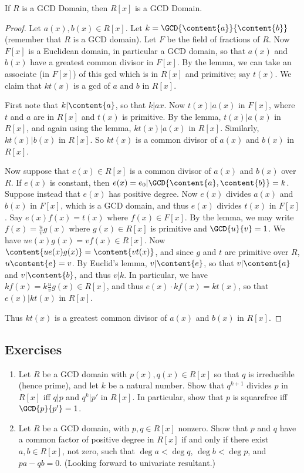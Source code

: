 \documentclass{article}
\begin{document}
\begin{prop}
If $R$ is a GCD Domain, then $R[x]$ is a GCD Domain.
\end{prop}

\begin{proof}
Let $a(x), b(x) \in R[x]$. Let $k = \GCD{\content{a}}{\content{b}}$ (remember that $R$ is a GCD domain). Let $F$ be the field of fractions of $R$. Now $F[x]$ is a Euclidean domain, in particular a GCD domain, so that $a(x)$ and $b(x)$ have a greatest common divisor in $F[x]$. By the lemma, we can take an associate (in $F[x]$) of this gcd which is in $R[x]$ and primitive; say $t(x)$. We claim that $kt(x)$ is a gcd of $a$ and $b$ in $R[x]$.

First note that $k|\content{a}$, so that $k|a{x}$. Now $t(x)|a(x)$ in $F[x]$, where $t$ and $a$ are in $R[x]$ and $t(x)$ is primitive. By the lemma, $t(x)|a(x)$ in $R[x]$, and again using the lemma, $kt(x)|a(x)$ in $R[x]$. Similarly, $kt(x)|b(x)$ in $R[x]$. So $kt(x)$ is a common divisor of $a(x)$ and $b(x)$ in $R[x]$.

Now suppose that $e(x) \in R[x]$ is a common divisor of $a(x)$ and $b(x)$ over $R$. If $e(x)$ is constant, then $e(x) = e_0 | \GCD{\content{a}, \content{b}} = k$. Suppose instead that $e(x)$ has positive degree. Now $e(x)$ divides $a(x)$ and $b(x)$ in $F[x]$, which is a GCD domain, and thus $e(x)$ divides $t(x)$ in $F[x]$. Say $e(x)f(x) = t(x)$ where $f(x) \in F[x]$. By the lemma, we may write $f(x) = \frac{u}{v}g(x)$ where $g(x) \in R[x]$ is primitive and $\GCD{u}{v} = 1$. We have $ue(x)g(x) = vf(x) \in R[x]$. Now $\content{ue(x)g(x)} = \content{vt(x)}$, and since $g$ and $t$ are primitive over $R$, $u\content{e} = v$. By Euclid's lemma, $v|\content{e}$, so that $v|\content{a}$ and $v|\content{b}$, and thus $v|k$. In particular, we have $kf(x) = k\frac{u}{v}g(x) \in R[x]$, and thus $e(x) \cdot kf(x) = kt(x)$, so that $e(x)|kt(x)$ in $R[x]$.

Thus $kt(x)$ is a greatest common divisor of $a(x)$ and $b(x)$ in $R[x]$.
\end{proof}

\subsection*{Exercises}

\begin{enumerate}
\item Let $R$ be a GCD domain with $p(x), q(x) \in R[x]$ so that $q$ is irreducible (hence prime), and let $k$ be a natural number. Show that $q^{k+1}$ divides $p$ in $R[x]$ iff $q|p$ and $q^k|p'$ in $R[x]$. In particular, show that $p$ is squarefree iff $\GCD{p}{p'} = 1$.

\item Let $R$ be a GCD domain, with $p,q \in R[x]$ nonzero. Show that $p$ and $q$ have a common factor of positive degree in $R[x]$ if and only if there exist $a,b \in R[x]$, not zero, such that $\deg{a} < \deg{q}$, $\deg{b} < \deg{p}$, and $pa - qb = 0$. (Looking forward to univariate resultant.)
\end{enumerate}
\end{document}
